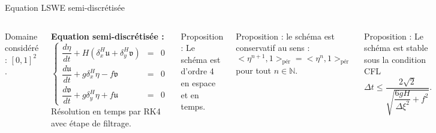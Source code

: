 \documentclass[11pt]{beamer}
\begin{document}
\begin{frame}{Equation LSWE semi-discrétisée}
\begin{columns}
Domaine considéré : $[0,1]^2$.

\textbf{Equation semi-discrétisée :}
$$
\left\lbrace
\begin{array}{rcl}
\dfrac{d \eta}{d t} + H \left( \delta_x^H \mathfrak{u} + \delta_y^H \mathfrak{v} \right) & = & 0 \\
\dfrac{d \mathfrak{u}}{d t} + g \delta_x^H \eta - f\mathfrak{v} & = & 0\\
\dfrac{d \mathfrak{v}}{d t} + g \delta_y^H \eta + f\mathfrak{u} & = & 0
\end{array}
\right.
$$
Résolution en temps par RK4 avec étape de filtrage.
\begin{block}{Proposition :}
Le schéma est d'ordre 4 en espace et en temps.
\end{block}
\begin{block}{Proposition :}
le schéma est conservatif au sens :
$$
<\eta^{n+1},\mathfrak{1}>_{\text{pér}} = <\eta^{n},\mathfrak{1}>_{\text{pér}}
$$
pour tout $n \in \mathbb{N}$.
\end{block}
\begin{block}{Proposition :}
Le schéma est stable sous la condition CFL
$$
\Delta t \leq \dfrac{2 \sqrt{2}}{\sqrt{\dfrac{6gH}{\Delta \xi^2} + f^2}}.
$$
\end{block}
\end{columns}
\end{frame}





































\end{document}
